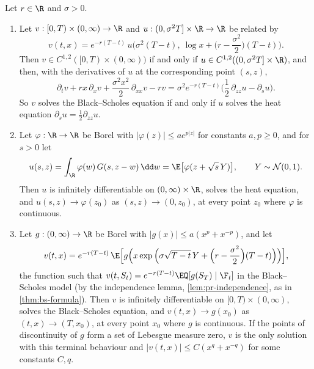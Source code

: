 \begin{proposition}\label{prop:fk-heat}
Let $r\in\R$ and $\sigma>0$.
\begin{enumerate}[label=(\roman*)]
  \item Let $v:[0,T)\times(0,\infty)\to\R$ and $u:(0,\sigma^2T]\times\R\to\R$ be related by
    \begin{equation}\label{eq:fk-heat-change}
      v(t,x)=e^{-r(T-t)}\,u\Big(\sigma^2(T-t),\ \log x+\Big(r-\frac{\sigma^2}2\Big)(T-t)\Big).
    \end{equation}
    Then $v\in C^{1,2}([0,T)\times(0,\infty))$ if and only if $u\in C^{1,2}((0,\sigma^2T]\times\R)$, and
    then, with the derivatives of $u$ at the corresponding point $(s,z)$,
    \[
      \partial_tv+rx\,\partial_xv+\frac{\sigma^2x^2}{2}\,\partial_{xx}v-rv
      =\sigma^2e^{-r(T-t)}\Big(\frac12\,\partial_{zz}u-\partial_su\Big).
    \]
    So $v$ solves the Black--Scholes equation if and only if $u$ solves the heat equation
    $\partial_su=\frac12\partial_{zz}u$.
  \item Let $\varphi:\R\to\R$ be Borel with $|\varphi(z)|\le ae^{p|z|}$ for constants $a,p\ge0$, and
    for $s>0$ let
    \[
      u(s,z)=\int_\R\varphi(w)\,G(s,z-w)\,\dd w=\E\big[\varphi(z+\sqrt s\,Y)\big],\qquad Y\sim\mathcal N(0,1).
    \]
    Then $u$ is infinitely differentiable on $(0,\infty)\times\R$, solves the heat equation, and
    $u(s,z)\to\varphi(z_0)$ as $(s,z)\to(0,z_0)$, at every point $z_0$ where $\varphi$ is continuous.
  \item Let $g:(0,\infty)\to\R$ be Borel with $|g(x)|\le a(x^p+x^{-p})$, and let
    \[
      v(t,x)=e^{-r(T-t)}\,\E\Big[g\Big(x\exp\Big(\sigma\sqrt{T-t}\,Y+\Big(r-\frac{\sigma^2}2\Big)(T-t)\Big)\Big)\Big],
    \]
    the function such that $v(t,S_t)=e^{-r(T-t)}\EQ[g(S_T)\mid\F_t]$ in the Black--Scholes model
    (by the independence lemma, \cref{lem:pr-independence}, as in \cref{thm:bs-formula}). Then $v$
    is infinitely differentiable on $[0,T)\times(0,\infty)$, solves the Black--Scholes equation, and
    $v(t,x)\to g(x_0)$ as $(t,x)\to(T,x_0)$, at every point $x_0$ where $g$ is continuous. If the
    points of discontinuity of $g$ form a set of Lebesgue measure zero, $v$ is the only solution
    with this terminal behaviour and $|v(t,x)|\le C(x^q+x^{-q})$ for some constants $C,q$.
\end{enumerate}
\end{proposition}


